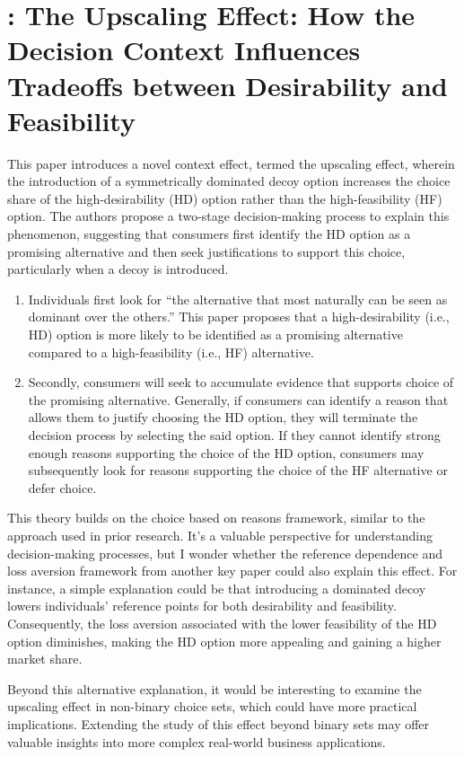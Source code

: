 \documentclass[11pt]{elegantbook}
\begin{document}
\section{\cite{evangelidis2023upscaling}: The Upscaling Effect: How the Decision Context Influences Tradeoffs between Desirability and Feasibility}
This paper introduces a novel context effect, termed the upscaling effect, wherein the introduction of a symmetrically dominated decoy option increases the choice share of the high-desirability (HD) option rather than the high-feasibility (HF) option. The authors propose a two-stage decision-making process to explain this phenomenon, suggesting that consumers first identify the HD option as a promising alternative and then seek justifications to support this choice, particularly when a decoy is introduced.
\begin{enumerate}
    \item Individuals first look for “the alternative that most naturally can be seen as dominant over the others.” This paper proposes that a high-desirability (i.e., HD) option is more likely to be identified as a promising alternative compared to a high-feasibility (i.e., HF) alternative.
    \item Secondly, consumers will seek to accumulate evidence that supports choice of the promising alternative.
    \subitem Generally, if consumers can identify a reason that allows them to justify choosing the HD option, they will terminate the decision process by selecting the said option. If they cannot identify strong enough reasons supporting the choice of the HD option, consumers may subsequently look for reasons supporting the choice of the HF alternative or defer choice.
\end{enumerate}

This theory builds on the choice based on reasons framework, similar to the approach used in prior research. It’s a valuable perspective for understanding decision-making processes, but I wonder whether the reference dependence and loss aversion framework from another key paper could also explain this effect. For instance, a simple explanation could be that introducing a dominated decoy lowers individuals’ reference points for both desirability and feasibility. Consequently, the loss aversion associated with the lower feasibility of the HD option diminishes, making the HD option more appealing and gaining a higher market share.

Beyond this alternative explanation, it would be interesting to examine the upscaling effect in non-binary choice sets, which could have more practical implications. Extending the study of this effect beyond binary sets may offer valuable insights into more complex real-world business applications.
\end{document}
